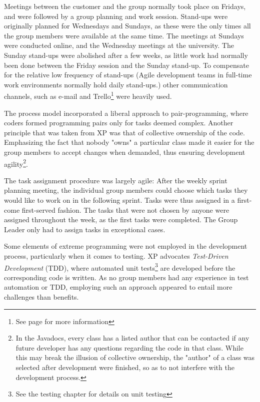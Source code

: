 Meetings between the customer and the group normally took place on Fridays, and were followed by a group planning and work session. Stand-ups were originally planned for Wednesdays and Sundays, as these were the only times all the group members were available at the same time. The meetings at Sundays were conducted online, and the Wednesday meetings at the university. The Sunday stand-ups were abolished after a few weeks, as little work had normally been done between the Friday session and the Sunday stand-up. To compensate for the relative low frequency of stand-ups (Agile development teams in full-time work environments normally hold daily stand-ups.) other communication channels, such as e-mail and Trello\footnote{See page \pageref{def:trello} for more information} were heavily used.

The process model incorporated a liberal approach to pair-programming, where coders formed programming pairs only for tasks deemed complex. Another principle that was taken from XP was that of collective ownership of the code. Emphasizing the fact that nobody "owns" a particular class made it easier for the group members to accept changes when demanded, thus ensuring development agility\footnote{In the Javadocs, every class has a listed author that can be contacted if any future developer has any questions regarding the code in that class. While this may break the illusion of collective ownership, the "author" of a class was selected after development were finished, so as to not interfere with the development process.}.

The task assignment procedure was largely agile: After the weekly sprint planning meeting, the individual group members could choose which tasks they would like to work on in the following sprint. Tasks were thus assigned in a first-come first-served fashion. The tasks that were not chosen by anyone were assigned throughout the week, as the first tasks were completed. The Group Leader only had to assign tasks in exceptional cases.

Some elements of extreme programming were not employed in the development process, particularly when it comes to testing. XP advocates \emph{Test-Driven Development} (TDD), where automated unit tests\footnote{See the testing chapter for details on unit testing} are developed before the corresponding code is written. As no group members had any experience in test automation or TDD, employing such an approach appeared to entail more challenges than benefits. 

